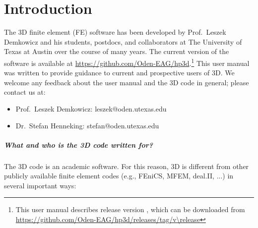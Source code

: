%
%

\chapter{Introduction}
\label{chap:introduction}



The \hp3D finite element (FE) software has been developed by Prof.~Leszek Demkowicz and his students, postdocs, and collaborators at The University of Texas at Austin over the course of many years. The current version of the software is available at \url{https://github.com/Oden-EAG/hp3d}.\footnote{This user manual describes release version \release, which can be downloaded from \url{https://github.com/Oden-EAG/hp3d/releases/tag/v\release}} This user manual was written to provide guidance to current and prospective users of \hp3D. We welcome any feedback about the user manual and the \hp3D code in general; please contact us at:
\begin{itemize}
	\item Prof.~Leszek Demkowicz: leszek@oden.utexas.edu
	\item Dr.~Stefan Henneking: stefan@oden.utexas.edu
\end{itemize}

\paragraph{What and who is the \hp3D code written for?}
The \hp3D code is an academic software. For this reason, \hp3D is different from other publicly available finite element codes (e.g., FEniCS, MFEM, deal.II, ...) in several important ways:

